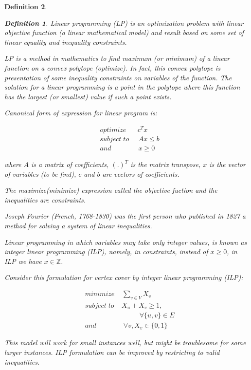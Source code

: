 \documentclass[12pt]{article}
\theoremstyle{slplain}
\newtheorem{defi}{Definition}
\begin{document}
\begin{defi}
\begin{defi}
Linear programming (LP) is an optimization problem with linear objective function (a linear mathematical model) and result based on some set of linear equality and inequality constraints. 

LP is a method in mathematics to find maximum (or minimum) of a linear function on a convex polytope (optimize). In fact, this convex polytope is presentation of some inequality constraints on variables of the function. The solution for a linear programming is a point in the polytope where this function has the largest (or smallest) value if such a point exists.

Canonical form of expression for linear program is:

\begin{align*}
&optimize \; \;\; \;\;\; c^Tx\\
&subject\; to \;\;\; \;\; Ax \leq b\\
&and	\qquad\qquad	 x \geq 0
\end{align*}

where $A$ is a matrix of coefficients, $(.)^T$ is the matrix transpose, $x$ is the vector of variables (to be find), $c$ and $b$ are vectors of coefficients.

The maximize(minimize) expression called the objective fuction and the inequalities are constraints.

Joseph Fourier (French, 1768-1830) was the first person who published in 1827 a method for solving a system of linear inequalities. \cite{gerard}

Linear programming in which variables may take only integer values, is known as integer linear programming (ILP), namely, in constraints, instead of $x\geq 0$, in ILP we have $x\in \mathbb{Z}$.
\end{defi}


Consider this formulation for vertex cover by integer linear programming (ILP):



\begin{align*}
&minimize \; \;\; \; \sum_{v\in V}X_v\\
&subject\; to \;\;\; \; X_u + X_v  \geq 1 ,\\
&\qquad 	\qquad\qquad\qquad	 \forall \{u,v\} \in E\\
&and	\qquad\qquad	 \forall v, X_v\in \{0,1\}
\end{align*}

This model will work for small instances well, but might be troublesome for some larger instances. ILP formulation can be improved  by restricting to valid inequalities.\cite{Gerard2} 


\end{defi}
\end{document}
